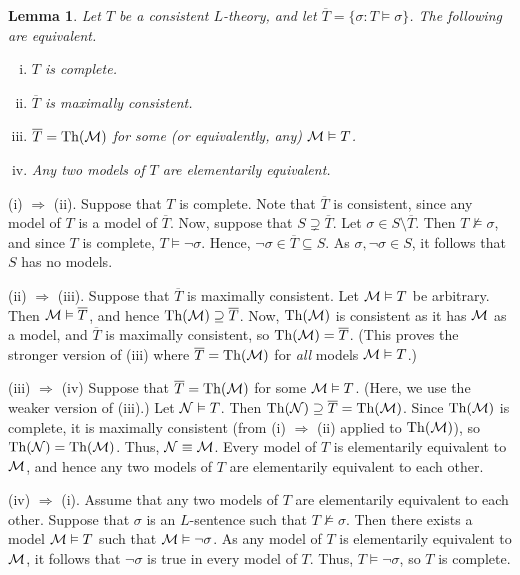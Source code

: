 \documentclass[10pt]{article}
\makeatletter
\DeclareMathOperator{\Th}{Th}
\theoremstyle{newstyle}
\newtheorem{lemma}[thm]{Lemma}
\newenvironment{pf}[1][\proofname]{\par
  \pushQED{\qed}%
  \normalfont \topsep0\p@\relax
  \trivlist
  \item[\hskip\labelsep\scshape
  #1\@addpunct{.}]\ignorespaces
}{%
  \popQED\endtrivlist\@endpefalse
}
\makeatother
\begin{document}
\begin{lemma}
Let $T$ be a consistent $L$-theory, and let $\overline{T} = \{\sigma : T \vDash \sigma\}$. 
The following are equivalent.
\begin{enumerate}[(i)]
    \item $T$ is complete.
    \item $\overline{T}$ is maximally consistent. 
    \item $\overline{T} = \Th({\cal M})$ for some (or equivalently, any) ${\cal M} \vDash T$. 
    \item Any two models of $T$ are elementarily equivalent. 
\end{enumerate}
\end{lemma}
\begin{pf}
(i) $\Rightarrow$ (ii). Suppose that $T$ is complete. Note that $\overline{T}$ is 
consistent, since any model of $T$ is a model of $\overline{T}$. Now, suppose 
that $S \supsetneq \overline{T}$. Let $\sigma \in S \setminus \overline{T}$. Then 
$T \nvDash \sigma$, and since $T$ is complete, $T \vDash \neg \sigma$. Hence, 
$\neg \sigma \in \overline{T} \subseteq S$. As
$\sigma, \neg \sigma \in S$, it follows that $S$ has no models. 

(ii) $\Rightarrow$ (iii). Suppose that $\overline{T}$ is maximally consistent. 
Let ${\cal M} \vDash T$ be arbitrary. Then ${\cal M} \vDash \overline{T}$, and 
hence $\Th({\cal M}) \supseteq \overline{T}$. Now, $\Th({\cal M})$ is consistent 
as it has ${\cal M}$ as a model, and $\overline{T}$ is maximally consistent, 
so $\Th({\cal M}) = \overline{T}$. (This proves the stronger version of (iii) where 
$\overline{T} = \Th({\cal M})$ for {\it all} models ${\cal M} \vDash T$.)

(iii) $\Rightarrow$ (iv) Suppose that $\overline{T} = \Th({\cal M})$ for some 
${\cal M} \vDash T$. (Here, we use the weaker version of (iii).) Let 
${\cal N} \vDash T$. Then $\Th({\cal N}) \supseteq \overline{T} = \Th({\cal M})$. 
Since $\Th({\cal M})$ is complete, it is maximally consistent 
(from (i) $\Rightarrow$ (ii) applied to $\Th({\cal M})$), so 
$\Th({\cal N}) = \Th({\cal M})$. Thus, ${\cal N} \equiv {\cal M}$. Every model 
of $T$ is elementarily equivalent to ${\cal M}$, and hence any two models of $T$ 
are elementarily equivalent to each other.

(iv) $\Rightarrow$ (i). Assume that any two models of $T$ are elementarily equivalent to each other. 
Suppose that $\sigma$ is an $L$-sentence such that $T \nvDash \sigma$. Then there exists 
a model ${\cal M} \vDash T$ such that ${\cal M} \vDash \neg \sigma$. As any model of $T$ 
is elementarily equivalent to ${\cal M}$, it follows that $\neg \sigma$ is true in every 
model of $T$. Thus, $T \vDash \neg \sigma$, so $T$ is complete. 
\end{pf}
\end{document}
